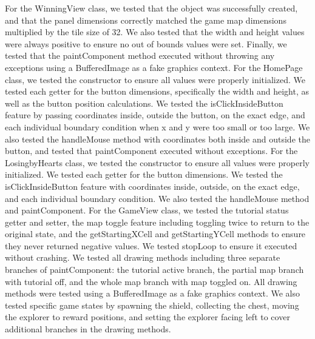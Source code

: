 \documentclass[12pt,letterpaper]{article}
\begin{document}
For the WinningView class, we tested that the object was successfully created, and that the panel dimensions correctly matched the game map dimensions multiplied by the tile size of 32. We also tested that the width and height values were always positive to ensure no out of bounds values were set. Finally, we tested that the paintComponent method executed without throwing any exceptions using a BufferedImage as a fake graphics context.
For the HomePage class, we tested the constructor to ensure all values were properly initialized. We tested each getter for the button dimensions, specifically the width and height, as well as the button position calculations. We tested the isClickInsideButton feature by passing coordinates inside, outside the button, on the exact edge, and each individual boundary condition when x and y were too small or too large. We also tested the handleMouse method with coordinates both inside and outside the button, and tested that paintComponent executed without exceptions.
For the LosingbyHearts class, we tested the constructor to ensure all values were properly initialized. We tested each getter for the button dimensions. We tested the isClickInsideButton feature with coordinates inside, outside, on the exact edge, and each individual boundary condition. We also tested the handleMouse method and paintComponent.
For the GameView class, we tested the tutorial status getter and setter, the map toggle feature including toggling twice to return to the original state, and the getStartingXCell and getStartingYCell methods to ensure they never returned negative values. We tested stopLoop to ensure it executed without crashing. We tested all drawing methods including three separate branches of paintComponent: the tutorial active branch, the partial map branch with tutorial off, and the whole map branch with map toggled on. All drawing methods were tested using a BufferedImage as a fake graphics context. We also tested specific game states by spawning the shield, collecting the chest, moving the explorer to reward positions, and setting the explorer facing left to cover additional branches in the drawing methods.
\end{document}
